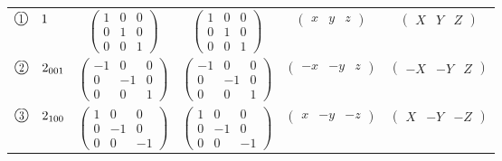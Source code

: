\documentclass[fleqn,10pt,landscape]{jsarticle}
\begin{document}
\begin{center}
\begin{longtable}{lcccc}
$ {\ooalign{\hfil\resizebox{.8\width}{\height}{1}\hfil\crcr\raise.1ex\hbox{\large$\bigcirc$}}}\quad 1 $ & $ \begin{pmatrix} 1 & 0 & 0 \\ 0 & 1 & 0 \\ 0 & 0 & 1 \end{pmatrix} $ & $ \begin{pmatrix} 1 & 0 & 0 \\ 0 & 1 & 0 \\ 0 & 0 & 1 \end{pmatrix} $ & $ \begin{pmatrix} x & y & z \end{pmatrix} $ & $ \begin{pmatrix} X & Y & Z \end{pmatrix} $ \\
$ {\ooalign{\hfil\resizebox{.8\width}{\height}{2}\hfil\crcr\raise.1ex\hbox{\large$\bigcirc$}}}\quad 2{}_{001} $ & $ \begin{pmatrix} -1 & 0 & 0 \\ 0 & -1 & 0 \\ 0 & 0 & 1 \end{pmatrix} $ & $ \begin{pmatrix} -1 & 0 & 0 \\ 0 & -1 & 0 \\ 0 & 0 & 1 \end{pmatrix} $ & $ \begin{pmatrix} - x & - y & z \end{pmatrix} $ & $ \begin{pmatrix} - X & - Y & Z \end{pmatrix} $ \\
$ {\ooalign{\hfil\resizebox{.8\width}{\height}{3}\hfil\crcr\raise.1ex\hbox{\large$\bigcirc$}}}\quad 2{}_{100} $ & $ \begin{pmatrix} 1 & 0 & 0 \\ 0 & -1 & 0 \\ 0 & 0 & -1 \end{pmatrix} $ & $ \begin{pmatrix} 1 & 0 & 0 \\ 0 & -1 & 0 \\ 0 & 0 & -1 \end{pmatrix} $ & $ \begin{pmatrix} x & - y & - z \end{pmatrix} $ & $ \begin{pmatrix} X & - Y & - Z \end{pmatrix} $ \\

\end{longtable}
\end{center}
\end{document}

